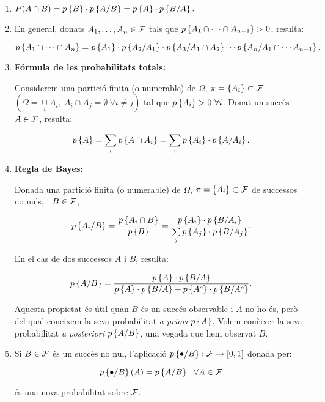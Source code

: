 \begin{enumerate}

\item $P(A \cap B) = p\left\{B\right\} \cdot p\left\{A/B\right\} = p\left\{A\right\} \cdot p\left\{B/A\right\}.$

\item En general, donats $A_1, \ldots , A_n \in {\cal F}$ tals que 
$p\left\{A_1 \cap \cdots \cap A_{n-1}\right\} > 0$, resulta:

$$p\left\{A_1 \cap \cdots \cap A_n\right\} = p\left\{A_1\right\} \cdot p\left\{A_2/A_1\right\} 
\cdot p\left\{A_3/A_1 \cap A_2\right\} \cdots p\left\{A_n/A_1 \cap \cdots A_{n-1}\right\}.$$

\item {\bf F\'ormula de les probabilitats totals:}

Considerem una partici\'o finita (o numerable) de $\Omega$, $\displaystyle \pi =
\{ A_i \} \subset {\cal F}$\break $(\Omega = \mathop{\cup}\limits_i A_i, \ A_i \cap
A_j = \emptyset \ \forall i \not = j)$ tal que $p\left\{A_i\right\} > 0 \ \forall i$. Donat un
succ\'es $A \in {\cal F}$, resulta:

$$p\left\{A\right\} = \sum_i p\left\{A \cap A_i\right\} = \sum_i p\left\{A_i\right\} \cdot p\left\{A/A_i\right\}.$$

\item {\bf Regla de Bayes:}

Donada una partici\'o finita (o numerable) de $\Omega$, $\pi = \{ A_i \} \subset
{\cal F}$ de successos no nuls, i $B \in {\cal F}$,

$$p\left\{A_i/B\right\} = {p\left\{A_i \cap B\right\} \over p\left\{B\right\}} = {p\left\{A_i\right\} \cdot 
p\left\{B/A_i\right\} \over \sum\limits_j p\left\{A_j\right\} \cdot p\left\{B/A_j\right\}}.$$

En el cas de dos successos $A$ i $B$, resulta:

$$p\left\{A/B\right\} = {p\left\{A\right\} \cdot p\left\{B/A\right\} \over
p\left\{A\right\} \cdot p\left\{B/A\right\} + p\left\{A^c\right\} \cdot p\left\{B/A^c\right\}}.$$

Aquesta propietat \'es \'util quan $B$ \'es un succ\'es observable i $A$ no ho
\'es, per\`o del qual coneixem la seva probabilitat {\it a priori}
 $p\left\{A\right\}$. 
Volem con\`eixer la seva probabilitat {\it a posteriori}
$p\left\{A/B\right\}$, una vegada que hem observat $B$.

\item Si $B \in {\cal F}$ \'es un succ\'es no nul, l'aplicaci\'o 
$p\left\{\bullet/B\right\} : {\cal F}
\to [0,1]$ donada per:

$$p\left\{\bullet/B\right\}(A) = p\left\{A/B\right\} \ \ \forall A \in {\cal F}$$

\'es una nova probabilitat sobre ${\cal F}$.

\end{enumerate}

